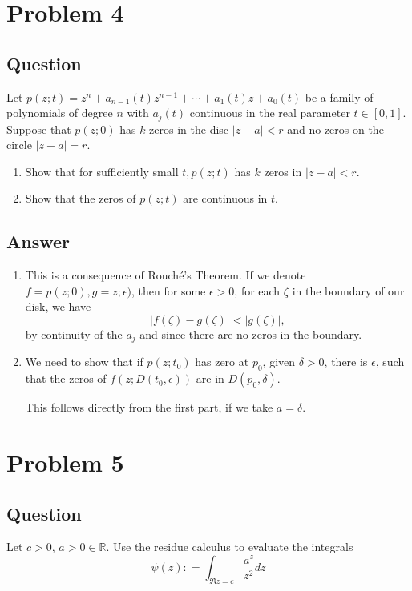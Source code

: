 \documentclass[11pt]{article}
\begin{document}
\section{Problem 4}
\subsection{Question}
Let $p(z;t) = z^n + a_{n-1} (t) z^{n-1} + \cdots + a_1(t) z  + a_0(t)$ be a family of polynomials of degree $n$ with $a_j(t)$ continuous in the real parameter $t \in [0,1]$. Suppose that $p(z;0)$ has $k$ zeros in the disc $|z-a| < r$ and no zeros on the circle $|z-a| = r$. 
\begin{enumerate}
\item Show that for sufficiently small $t, p(z;t)$ has $k$ zeros in $|z-a| <r$.
\item Show that the zeros of $p(z;t)$ are continuous in $t$.
\end{enumerate}
\subsection{Answer}
\begin{enumerate}
\item This is a consequence of Rouch\'{e}'s Theorem.  If we denote $f = p(z;0), g = z; \epsilon)$, then for some $\epsilon > 0$, for each $\zeta$ in the boundary of our disk, we have 
\[|f(\zeta) - g(\zeta)| < |g(\zeta)|,\]
by continuity of the $a_j$ and since there are no zeros in the boundary.
\item We need to show that if $p(z;t_0)$ has zero at $p_0$, given $\delta > 0 $, there is $\epsilon$, such that  the zeros of $f(z; D(t_0,\epsilon)) $ are in $  D(p_0, \delta)$.  

This follows directly from the first part, if we take $ a = \delta$.
\end{enumerate}

\section{Problem 5}
\subsection{Question}
Let $c> 0$, $a>0\in \mathbb{R} $. Use the residue calculus to evaluate the integrals
\[\psi(z) : = \int_{\Re z =c} \frac{a^z}{z^2} dz\]
\end{document}
